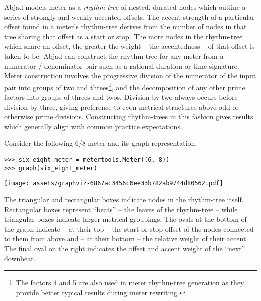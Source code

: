 Abjad models meter as a \emph{rhythm-tree} of nested, durated nodes which
outline a series of strongly and weakly accented offsets. The accent strength
of a particular offset found in a meter's rhythm-tree derives from the number
of nodes in that tree sharing that offset as a start or stop. The more nodes in
the rhythm-tree which share an offset, the greater the weight -- the
accentedness -- of that offset is taken to be. Abjad can construct the rhythm
tree for any meter from a numerator / denominator pair such as a rational
duration or time signature. Meter construction involves the progressive
division of the numerator of the input pair into groups of two and
threes\footnote{The factors 4 and 5 are also used in meter rhythm-tree
generation as they provide better typical results during meter rewriting.}, and
the decomposition of any other prime factors into groups of threes and twos.
Division by two always occurs before division by three, giving preference to
even metrical structures above odd or otherwise prime divisions. Constructing
rhythm-trees in this fashion gives results which generally align with common
practice expectations.

Consider the following 6/8 meter and its graph representation:

\begin{comment}
<abjad>
six_eight_meter = metertools.Meter((6, 8))
graph(six_eight_meter)
</abjad>
\end{comment}

\begin{singlespacing}
\vspace{-0.5\baselineskip}
\begin{lstlisting}
>>> six_eight_meter = metertools.Meter((6, 8))
>>> graph(six_eight_meter)
\end{lstlisting}
\noindent\texttt{[image: assets/graphviz-6867ac3456c6ee33b782ab9744d80562.pdf]}
\end{singlespacing}

\noindent The triangular and rectangular boxes indicate nodes in the
rhythm-tree itself. Rectangular boxes represent \enquote{beats} -- the leaves
of the rhythm-tree -- while triangular boxes indicate larger metrical
groupings. The ovals at the bottom of the graph indicate -- at their top -- the
start or stop offset of the nodes connected to them from above and -- at their
bottom -- the relative weight of their accent. The final oval on the right
indicates the offset and accent weight of the \enquote{next} downbeat.

